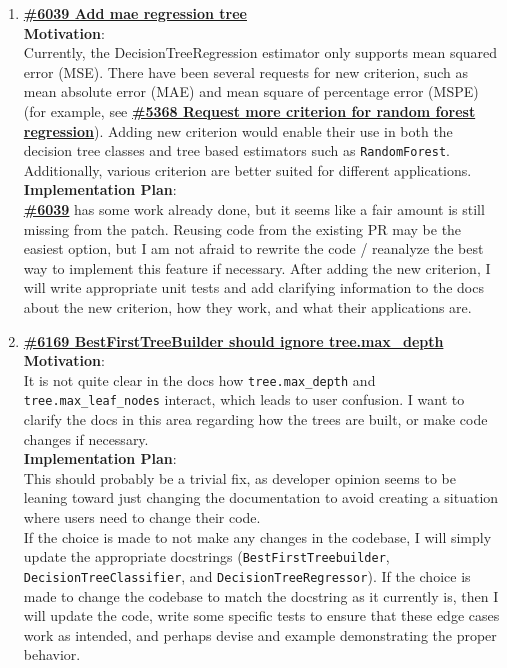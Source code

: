 \documentclass[12pt, oneside]{article}
\begin{document}
\begin{enumerate}
  \item
  \textbf{\href{https://github.com/scikit-learn/scikit-learn/pull/6039}
    {\#6039 Add mae regression tree}}\\
  \textbf{Motivation}:\\
  Currently, the DecisionTreeRegression estimator only supports mean
  squared error (MSE). There have been several requests for new
  criterion, such as mean absolute error (MAE) and mean square of
  percentage error (MSPE) (for example, see
  \textbf{\href{https://github.com/scikit-learn/scikit-learn/issues/5368}
    {\#5368 Request more criterion for random forest
      regression}}). Adding new criterion would enable their use in
  both the decision tree classes and tree based estimators such as
  \texttt{RandomForest}. Additionally, various criterion are better
  suited for different applications.\\
  \textbf{Implementation Plan}:\\
  \textbf{\href{https://github.com/scikit-learn/scikit-learn/pull/6039}
    {\#6039}} has some work already done, but it seems like a fair
  amount is still missing from the patch. Reusing code from the
  existing PR may be the easiest option, but I am not afraid to
  rewrite the code / reanalyze the best way to implement this feature
  if necessary. After adding the new criterion, I will write
  appropriate unit tests and add clarifying information to the docs
  about the new criterion, how they work, and what their applications
  are.

  \item
  \textbf{\href{https://github.com/scikit-learn/scikit-learn/pull/6169}
    {\#6169 BestFirstTreeBuilder should ignore tree.max\_depth}}\\
  \textbf{Motivation}:\\
  It is not quite clear in the docs how
  \texttt{tree.max\_depth} and \texttt{tree.max\_leaf\_nodes}
  interact, which leads to user confusion. I want to clarify the docs
  in this area regarding how the trees are built, or make code changes
  if necessary.\\
  \textbf{Implementation Plan}:\\
  This should probably be a trivial fix, as developer opinion seems to
  be leaning toward just changing the documentation to avoid creating
  a situation where users need to change their code.\\
  If the choice is made to not make any changes in the codebase, I
  will simply update the appropriate docstrings
  (\texttt{BestFirstTreebuilder}, \texttt{DecisionTreeClassifier}, and
  \texttt{DecisionTreeRegressor}).
  If the choice is made to change the codebase to match the docstring
  as it currently is, then I will update the code, write some specific
  tests to ensure that these edge cases work as intended, and perhaps
  devise and example demonstrating the proper behavior.


\end{enumerate}
\end{document}

